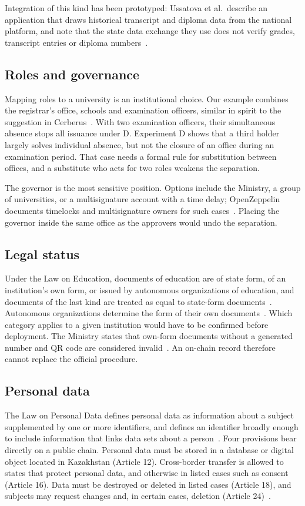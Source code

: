 Integration of this kind has been prototyped: Ussatova et al.\ describe an application that draws historical transcript and diploma data from the national platform, and note that the state data exchange they use does not verify grades, transcript entries or diploma numbers~\cite{ussatova2026b}.

\subsection{Roles and governance}
Mapping roles to a university is an institutional choice. Our example combines the registrar's office, schools and examination officers, similar in spirit to the suggestion in Cerberus~\cite{tariq2023}. With two examination officers, their simultaneous absence stops all issuance under D. Experiment D shows that a third holder largely solves individual absence, but not the closure of an office during an examination period. That case needs a formal rule for substitution between offices, and a substitute who acts for two roles weakens the separation.

The governor is the most sensitive position. Options include the Ministry, a group of universities, or a multisignature account with a time delay; OpenZeppelin documents timelocks and multisignature owners for such cases~\cite{ozdocs}. Placing the governor inside the same office as the approvers would undo the separation.

\subsection{Legal status}
Under the Law on Education, documents of education are of state form, of an institution's own form, or issued by autonomous organizations of education, and documents of the last kind are treated as equal to state-form documents~\cite{kzedu}. Autonomous organizations determine the form of their own documents~\cite{kzedu}. Which category applies to a given institution would have to be confirmed before deployment. The Ministry states that own-form documents without a generated number and QR code are considered invalid~\cite{kznews2026}. An on-chain record therefore cannot replace the official procedure.

\subsection{Personal data}
The Law on Personal Data defines personal data as information about a subject supplemented by one or more identifiers, and defines an identifier broadly enough to include information that links data sets about a person~\cite{kzdata}. Four provisions bear directly on a public chain. Personal data must be stored in a database or digital object located in Kazakhstan (Article 12). Cross-border transfer is allowed to states that protect personal data, and otherwise in listed cases such as consent (Article 16). Data must be destroyed or deleted in listed cases (Article 18), and subjects may request changes and, in certain cases, deletion (Article 24)~\cite{kzdata}.

